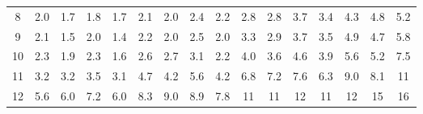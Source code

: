 \begin{table}[!htbp]
{\begin{tabular}{c|ccccccccccccccc}
        \rowcolor[HTML]{FFFFFF} 
        8                          & \multicolumn{1}{l|}{\cellcolor[HTML]{CCC0DA}2.0} & \cellcolor[HTML]{CCC0DA}1.7 & \cellcolor[HTML]{CCC0DA}1.8 & \cellcolor[HTML]{CCC0DA}1.7 & 2.1                         & \multicolumn{1}{l|}{\cellcolor[HTML]{CCC0DA}2.0} & 2.4                        & 2.2                         & 2.8                         & 2.8                         & 3.7                         & 3.4                         & 4.3                         & 4.8                         & 5.2                         \\
        \rowcolor[HTML]{FFFFFF} 
        9                          & \multicolumn{1}{l|}{\cellcolor[HTML]{FFFFFF}2.1} & \cellcolor[HTML]{B1A0C7}1.5 & \cellcolor[HTML]{CCC0DA}2.0 & \cellcolor[HTML]{B1A0C7}1.4 & 2.2                         & \multicolumn{1}{l|}{\cellcolor[HTML]{CCC0DA}2.0} & 2.5                        & \cellcolor[HTML]{CCC0DA}2.0 & 3.3                         & 2.9                         & 3.7                         & 3.5                         & 4.9                         & 4.7                         & 5.8                         \\ \cline{3-7}
        \rowcolor[HTML]{FFFFFF} 
        10                         & 2.3                                              & \cellcolor[HTML]{CCC0DA}1.9 & 2.3                         & \cellcolor[HTML]{CCC0DA}1.6 & 2.6                         & 2.7                                              & 3.1                        & 2.2                         & 4.0                         & 3.6                         & 4.6                         & 3.9                         & 5.6                         & 5.2                         & 7.5                         \\
        \rowcolor[HTML]{FFFFFF} 
        11                         & 3.2                                              & 3.2                         & 3.5                         & 3.1                         & 4.7                         & 4.2                                              & 5.6                        & 4.2                         & 6.8                         & 7.2                         & 7.6                         & 6.3                         & 9.0                         & 8.1                         & \cellcolor[HTML]{8DB4E2}11  \\
        \rowcolor[HTML]{FFFFFF} 
        12                         & 5.6                                              & 6.0                         & 7.2                         & 6.0                         & 8.3                         & 9.0                                              & 8.9                        & 7.8                         & \cellcolor[HTML]{8DB4E2}11  & \cellcolor[HTML]{8DB4E2}11  & \cellcolor[HTML]{8DB4E2}12  & \cellcolor[HTML]{8DB4E2}11  & \cellcolor[HTML]{8DB4E2}12  & \cellcolor[HTML]{8DB4E2}15  & \cellcolor[HTML]{8DB4E2}16  \\

\end{tabular}}
\end{table}

